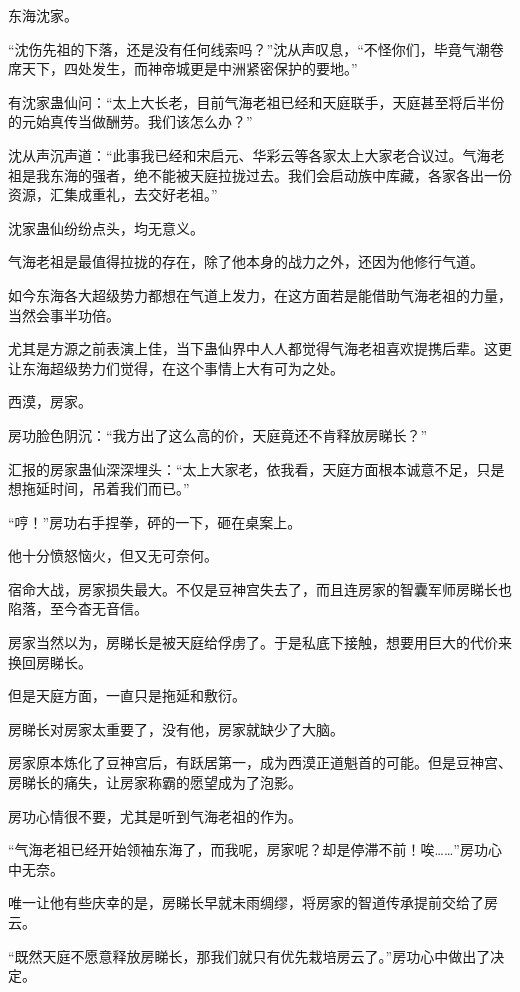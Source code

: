 \begin{this_body}
东海沈家。

“沈伤先祖的下落，还是没有任何线索吗？”沈从声叹息，“不怪你们，毕竟气潮卷席天下，四处发生，而神帝城更是中洲紧密保护的要地。”

有沈家蛊仙问：“太上大长老，目前气海老祖已经和天庭联手，天庭甚至将后半份的元始真传当做酬劳。我们该怎么办？”

沈从声沉声道：“此事我已经和宋启元、华彩云等各家太上大家老合议过。气海老祖是我东海的强者，绝不能被天庭拉拢过去。我们会启动族中库藏，各家各出一份资源，汇集成重礼，去交好老祖。”

沈家蛊仙纷纷点头，均无意义。

气海老祖是最值得拉拢的存在，除了他本身的战力之外，还因为他修行气道。

如今东海各大超级势力都想在气道上发力，在这方面若是能借助气海老祖的力量，当然会事半功倍。

尤其是方源之前表演上佳，当下蛊仙界中人人都觉得气海老祖喜欢提携后辈。这更让东海超级势力们觉得，在这个事情上大有可为之处。

西漠，房家。

房功脸色阴沉：“我方出了这么高的价，天庭竟还不肯释放房睇长？”

汇报的房家蛊仙深深埋头：“太上大家老，依我看，天庭方面根本诚意不足，只是想拖延时间，吊着我们而已。”

“哼！”房功右手捏拳，砰的一下，砸在桌案上。

他十分愤怒恼火，但又无可奈何。

宿命大战，房家损失最大。不仅是豆神宫失去了，而且连房家的智囊军师房睇长也陷落，至今杳无音信。

房家当然以为，房睇长是被天庭给俘虏了。于是私底下接触，想要用巨大的代价来换回房睇长。

但是天庭方面，一直只是拖延和敷衍。

房睇长对房家太重要了，没有他，房家就缺少了大脑。

房家原本炼化了豆神宫后，有跃居第一，成为西漠正道魁首的可能。但是豆神宫、房睇长的痛失，让房家称霸的愿望成为了泡影。

房功心情很不要，尤其是听到气海老祖的作为。

“气海老祖已经开始领袖东海了，而我呢，房家呢？却是停滞不前！唉……”房功心中无奈。

唯一让他有些庆幸的是，房睇长早就未雨绸缪，将房家的智道传承提前交给了房云。

“既然天庭不愿意释放房睇长，那我们就只有优先栽培房云了。”房功心中做出了决定。


\end{this_body}
